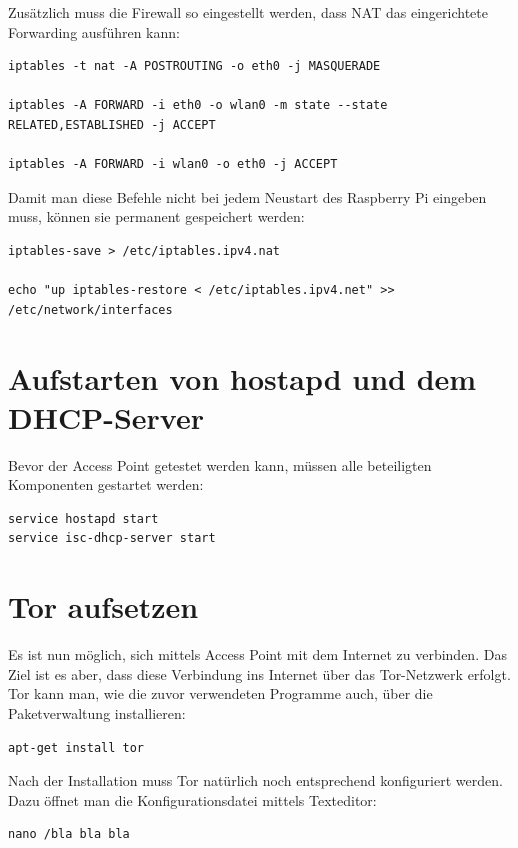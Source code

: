 Zusätzlich muss die Firewall so eingestellt werden, dass NAT das eingerichtete Forwarding ausführen kann:

\begin{lstlisting}
iptables -t nat -A POSTROUTING -o eth0 -j MASQUERADE

iptables -A FORWARD -i eth0 -o wlan0 -m state --state RELATED,ESTABLISHED -j ACCEPT

iptables -A FORWARD -i wlan0 -o eth0 -j ACCEPT
\end{lstlisting}

Damit man diese Befehle nicht bei jedem Neustart des Raspberry Pi eingeben muss, können sie permanent gespeichert werden:

\begin{lstlisting}
iptables-save > /etc/iptables.ipv4.nat

echo "up iptables-restore < /etc/iptables.ipv4.net" >> /etc/network/interfaces
\end{lstlisting}

\section{Aufstarten von hostapd und dem DHCP-Server}
Bevor der Access Point getestet werden kann, müssen alle beteiligten Komponenten gestartet werden:

\begin{lstlisting}
service hostapd start
service isc-dhcp-server start
\end{lstlisting}


\section{Tor aufsetzen}
Es ist nun möglich, sich mittels Access Point mit dem Internet zu verbinden. Das Ziel ist es aber, dass diese Verbindung ins Internet über das Tor-Netzwerk erfolgt. Tor kann man, wie die zuvor verwendeten Programme auch, über die Paketverwaltung installieren:

\begin{lstlisting}
apt-get install tor
\end{lstlisting}

Nach der Installation muss Tor natürlich noch entsprechend konfiguriert werden. Dazu öffnet man die Konfigurationsdatei mittels Texteditor: 

\begin{lstlisting}
nano /bla bla bla
\end{lstlisting} 

